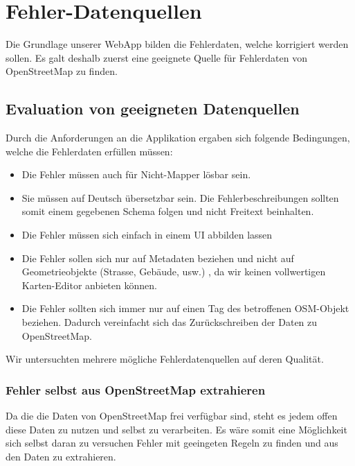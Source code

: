 \chapter{Fehler-Datenquellen}
\label{datenquellen}
Die Grundlage unserer \gls{WebApp} bilden die Fehlerdaten, welche korrigiert werden sollen.
Es galt deshalb zuerst eine geeignete Quelle für Fehlerdaten von \gls{OpenStreetMap} zu finden.

\section{Evaluation von geeigneten Datenquellen}
Durch die Anforderungen an die Applikation ergaben sich folgende Bedingungen, welche die Fehlerdaten erfüllen müssen:

\begin{itemize}
\item Die Fehler müssen auch für Nicht-\gls{Mapper} lösbar sein.
\item Sie müssen auf Deutsch übersetzbar sein. Die Fehlerbeschreibungen sollten somit einem gegebenen Schema folgen und nicht Freitext beinhalten.
\item Die Fehler müssen sich einfach in einem UI abbilden lassen
\item Die Fehler sollen sich nur auf Metadaten beziehen und nicht auf Geometrieobjekte (Strasse, Gebäude, usw.) , da wir keinen vollwertigen Karten-Editor anbieten können.
\item Die Fehler sollten sich immer nur auf einen \gls{Tag} des betroffenen OSM-Objekt beziehen. Dadurch vereinfacht sich das Zurückschreiben der Daten zu \gls{OpenStreetMap}.
\end{itemize}

Wir untersuchten mehrere mögliche Fehlerdatenquellen auf deren Qualität.

\subsection{Fehler selbst aus OpenStreetMap extrahieren}
Da die die Daten von OpenStreetMap frei verfügbar sind, steht es jedem offen diese Daten zu nutzen und selbst zu verarbeiten.
Es wäre somit eine Möglichkeit sich selbst daran zu versuchen Fehler mit geeingeten Regeln zu finden und aus den Daten zu extrahieren.

